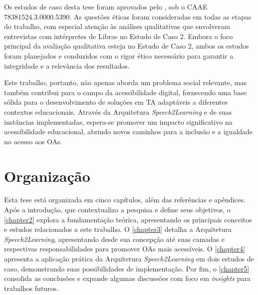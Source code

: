 Os estudos de caso desta tese foram aprovados pelo , sob o CAAE 78381524.3.0000.5390. As questões éticas foram consideradas em todas as etapas do trabalho, com especial atenção às análises qualitativas que envolveram entrevistas com intérpretes de Libras no Estudo de Caso 2. Embora o foco principal da avaliação qualitativa esteja no Estudo de Caso 2, ambos os estudos foram planejados e conduzidos com o rigor ético necessário para garantir a integridade e a relevância dos resultados.

Este trabalho, portanto, não apenas aborda um problema social relevante, mas também contribui para o campo da acessibilidade digital, fornecendo uma base sólida para o desenvolvimento de soluções em TA adaptáveis a diferentes contextos educacionais. Através da Arquitetura \textit{Speech2Learning} e de suas instâncias implementadas, espera-se promover um impacto significativo na acessibilidade educacional, abrindo novos caminhos para a inclusão e a igualdade no acesso aos OAs.

\section{Organização}

Esta tese está organizada em cinco capítulos, além das referências e apêndices. Após a introdução, que contextualiza a pesquisa e define seus objetivos, o \autoref{chapter2} explora a fundamentação teórica, apresentando os principais conceitos e estudos relacionados a este trabalho. O \autoref{chapter3} detalha a Arquitetura \textit{Speech2Learning}, apresentando desde sua concepção até suas camadas e respectivas responsabilidades para promover OAs mais acessíveis. O \autoref{chapter4} apresenta a aplicação prática da Arquitetura \textit{Speech2Learning} em dois estudos de caso, demonstrando suas possibilidades de implementação. Por fim, o \autoref{chapter5} consolida as conclusões e expande algumas discussões com foco em \textit{insights} para trabalhos futuros.